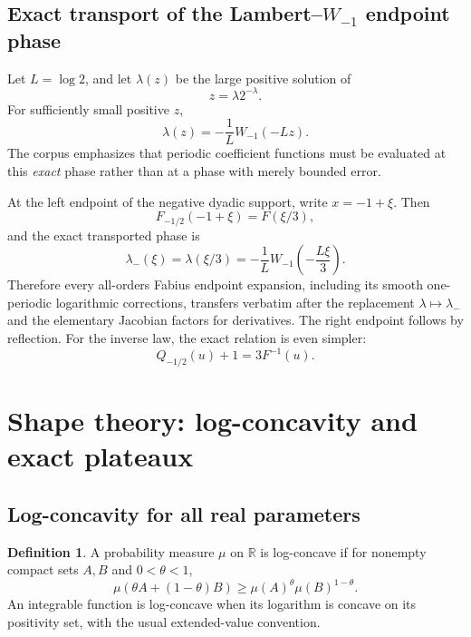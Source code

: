 \documentclass[11pt]{article}
\theoremstyle{definition}
\newtheorem{definition}[theorem]{Definition}
\newcommand{\R}{\mathbb R}
\begin{document}
\subsection{Exact transport of the Lambert--\texorpdfstring{$W_{-1}$}{W-1} endpoint phase}

Let \(L=\log2\), and let \(\lambda(z)\) be the large positive solution of
\begin{equation}
 z=\lambda2^{-\lambda}.
\end{equation}
For sufficiently small positive \(z\),
\begin{equation}
 \lambda(z)=-\frac1L W_{-1}(-Lz).                         \label{eq:lambert-phase}
\end{equation}
The corpus emphasizes that periodic coefficient functions must be evaluated at this
\emph{exact} phase rather than at a phase with merely bounded error.

At the left endpoint of the negative dyadic support, write \(x=-1+\xi\).  Then
\begin{equation}
 F_{-1/2}(-1+\xi)=F(\xi/3),                               \label{eq:endpoint-transport}
\end{equation}
and the exact transported phase is
\begin{equation}
 \boxed{
 \lambda_-(\xi)=\lambda(\xi/3)
 =-\frac1L W_{-1}\!\left(-\frac{L\xi}{3}\right).}        \label{eq:negative-lambert-phase}
\end{equation}
Therefore every all-orders Fabius endpoint expansion, including its smooth one-periodic
logarithmic corrections, transfers verbatim after the replacement
\(\lambda\mapsto\lambda_-\) and the elementary Jacobian factors for derivatives.  The
right endpoint follows by reflection.  For the inverse law, the exact relation is even
simpler:
\begin{equation}
 Q_{-1/2}(u)+1=3F^{-1}(u).                                \label{eq:inverse-endpoint-transport}
\end{equation}

\section{Shape theory: log-concavity and exact plateaux}

\subsection{Log-concavity for all real parameters}

\begin{definition}
A probability measure \(\mu\) on \(\R\) is log-concave if for nonempty compact sets
\(A,B\) and \(0<\theta<1\),
\[
 \mu(\theta A+(1-\theta)B)
 \ge \mu(A)^\theta\mu(B)^{1-\theta}.
\]
An integrable function is log-concave when its logarithm is concave on its positivity
set, with the usual extended-value convention.
\end{definition}
\end{document}
